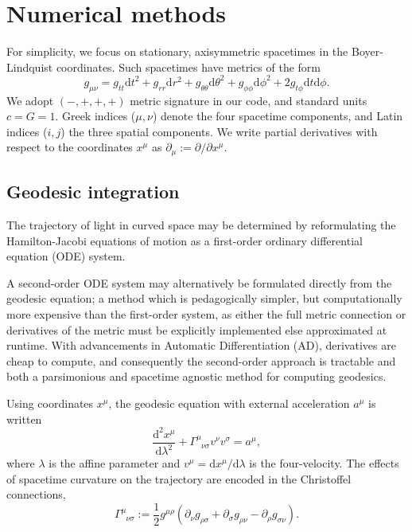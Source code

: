 \documentclass[fleqn,usenatbib]{mnras}
\renewcommand{\d}{\text{d}}
\newcommand{\utensor}[3]{#1^{#2}_{\phantom{#2}#3}}
\newcommand{\vel}[1]{v^{#1}}
\begin{document}
\section{Numerical methods}
\label{sec:numerical-methods}

For simplicity, we focus on stationary, axisymmetric spacetimes in the
Boyer-Lindquist coordinates. Such spacetimes have metrics of the form
\begin{equation}
\label{eq:stationary_axisymmetric_metric}
    g_{\mu\nu}
    = g_{tt} \d t^2
    + g_{rr} \d r^2
    + g_{\theta\theta} \d \theta^2
    + g_{\phi\phi} \d \phi^2
    + 2g_{t\phi} \d t \d \phi.
\end{equation}
We adopt $(-, +, +, +)$ metric signature in our code, and standard units $c = G
= 1$. Greek indices ($\mu, \nu$) denote the four spacetime components, and Latin
indices ($i, j$) the three spatial components. We write partial derivatives with
respect to the coordinates $x^\mu$ as $\partial_\mu := \partial / \partial
x^\mu$.

\subsection{Geodesic integration}

The trajectory of light in curved space may be determined by reformulating the
Hamilton-Jacobi equations of motion as a first-order ordinary differential
equation (ODE) system.

A second-order ODE system may alternatively be formulated directly from the
geodesic equation; a method which is pedagogically simpler, but computationally
more expensive than the first-order system, as either the full metric connection
or derivatives of the metric must be explicitly implemented else approximated at
runtime. With advancements in Automatic Differentiation (AD), derivatives are
cheap to compute, and consequently the second-order approach is tractable and
both a parsimonious and spacetime agnostic method for computing geodesics.

Using coordinates $x^\mu$, the geodesic equation with external acceleration
$a^\mu$ is written
\begin{equation}
\label{eq:geodesic_equation}
    \frac{\d^2 x^\mu}{\d \lambda^2}
    + \utensor{\Gamma}{\mu}{\nu\sigma}
    \vel{\nu}
    \vel{\sigma}
    = a^\mu,
\end{equation}
where $\lambda$ is the affine parameter and $v^\mu = \d x^\mu / \d \lambda$ is
the four-velocity. The effects of spacetime curvature on the trajectory are
encoded in the Christoffel connections,
\begin{equation}
\label{eq:christoffel}
    \utensor{\Gamma}{\mu}{\nu\sigma}
    := \frac{1}{2} g^{\mu\rho}
    \left(
        \partial_{\nu}g_{\rho \sigma}
        + \partial_{\sigma}g_{\rho \nu}
        - \partial_{\rho}g_{\sigma \nu}
    \right).
\end{equation}
\end{document}

